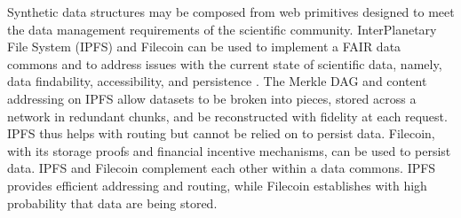 \documentclass[conference]{IEEEtran}
\begin{document}
Synthetic data structures may be composed from web primitives designed to meet the data management requirements of the scientific community. InterPlanetary File System (IPFS) and Filecoin can be used to implement a FAIR data commons and to address issues with the current state of scientific data, namely, data findability, accessibility, and persistence \cite{ipfs, psaras2020interplanetary}.
The Merkle DAG and content addressing on IPFS allow datasets to be broken into pieces, stored across a network in redundant chunks, and be reconstructed with fidelity at each request. IPFS thus helps with routing but cannot be relied on to persist data. Filecoin, with its storage proofs and financial incentive mechanisms, can be used to persist data. 
IPFS and Filecoin complement each other within a data commons. IPFS provides efficient addressing and routing, while Filecoin establishes with high probability that data are being stored.
\end{document}
